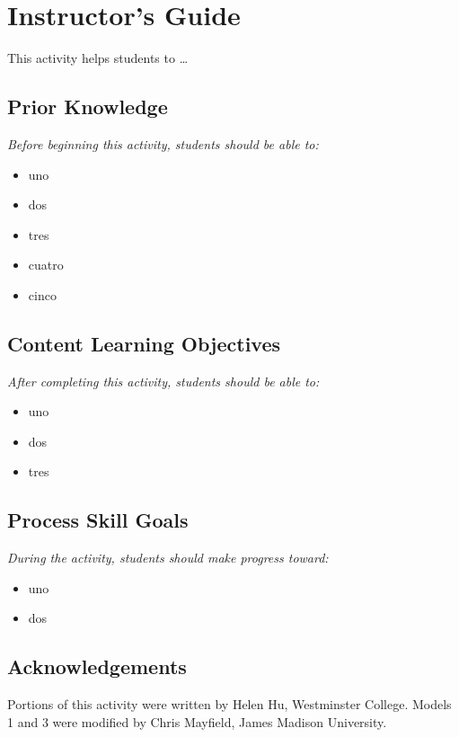 \maketitle
\section*{Instructor's Guide}

This activity helps students to \ldots

\subsection*{Prior Knowledge}
\textit{Before beginning this activity, students should be able to:}

\begin{itemize}[nosep]
\item uno
\item dos
\item tres
\item cuatro
\item cinco
\end{itemize}

\subsection*{Content Learning Objectives}
\textit{After completing this activity, students should be able to:}

\begin{itemize}[nosep]
\item uno
\item dos
\item tres
\end{itemize}

\subsection*{Process Skill Goals}
\textit{During the activity, students should make progress toward:}

\begin{itemize}[nosep]
\item uno
\item dos
\end{itemize}

\subsection*{Acknowledgements}

Portions of this activity were written by Helen Hu, Westminster College.
Models 1 and 3 were modified by Chris Mayfield, James Madison University.

\clearpage
